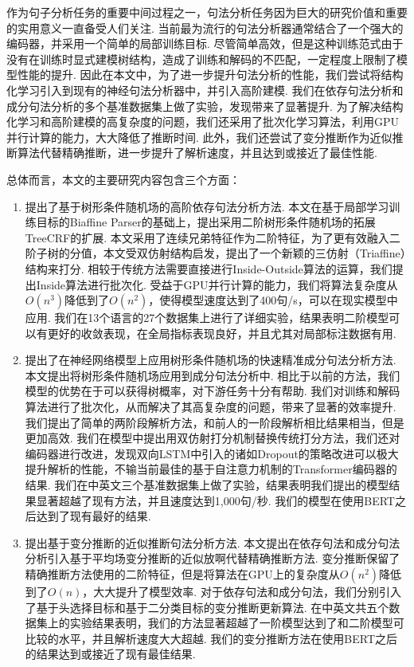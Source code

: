 
\begin{cabstract}
  作为句子分析任务的重要中间过程之一，句法分析任务因为巨大的研究价值和重要的实用意义一直备受人们关注.
  当前最为流行的句法分析器通常结合了一个强大的编码器，并采用一个简单的局部训练目标.
  尽管简单高效，但是这种训练范式由于没有在训练时显式建模树结构，造成了训练和解码的不匹配，一定程度上限制了模型性能的提升.
  因此在本文中，为了进一步提升句法分析的性能，我们尝试将结构化学习引入到现有的神经句法分析器中，并引入高阶建模.
  我们在依存句法分析和成分句法分析的多个基准数据集上做了实验，发现带来了显著提升.
  为了解决结构化学习和高阶建模的高复杂度的问题，我们还采用了批次化学习算法，利用GPU并行计算的能力，大大降低了推断时间.
  此外，我们还尝试了变分推断作为近似推断算法代替精确推断，进一步提升了解析速度，并且达到或接近了最佳性能.

  总体而言，本文的主要研究内容包含三个方面：
  \begin{enumerate}
    \item 提出了基于树形条件随机场的高阶依存句法分析方法.
          本文在基于局部学习训练目标的Biaffine Parser的基础上，提出采用二阶树形条件随机场的拓展TreeCRF的扩展.
          本文采用了连续兄弟特征作为二阶特征，为了更有效融入二阶子树的分值，本文受双仿射结构启发，提出了一个新颖的三仿射（Triaffine）结构来打分.
          相较于传统方法需要直接进行Inside-Outside算法的运算，我们提出Inside算法进行批次化.
          受益于GPU并行计算的能力，我们将算法复杂度从$O(n^3)$降低到了$O(n^2)$，使得模型速度达到了400句/s，可以在现实模型中应用.
          我们在13个语言的27个数据集上进行了详细实验，结果表明二阶模型可以有更好的收敛表现，在全局指标表现良好，并且尤其对局部标注数据有用.
    \item 提出了在神经网络模型上应用树形条件随机场的快速精准成分句法分析方法.
          本文提出将树形条件随机场应用到成分句法分析中.
          相比于以前的方法，我们模型的优势在于可以获得树概率，对下游任务十分有帮助.
          我们对训练和解码算法进行了批次化，从而解决了其高复杂度的问题，带来了显著的效率提升.
          我们提出了简单的两阶段解析方法，和前人的一阶段解析相比结果相当，但是更加高效.
          我们在模型中提出用双仿射打分机制替换传统打分方法，我们还对编码器进行改进，发现双向LSTM中引入的诸如Dropout的策略改进可以极大提升解析的性能，不输当前最佳的基于自注意力机制的Transformer编码器的结果.
          我们在中英文三个基准数据集上做了实验，结果表明我们提出的模型结果显著超越了现有方法，并且速度达到1,000句/秒.
          我们的模型在使用BERT之后达到了现有最好的结果.
    \item 提出基于变分推断的近似推断句法分析方法.
          本文提出在依存句法和成分句法分析引入基于平均场变分推断的近似放啊代替精确推断方法.
          变分推断保留了精确推断方法使用的二阶特征，但是将算法在GPU上的复杂度从$O(n^2)$降低到了$O(n)$，大大提升了模型效率.
          对于依存句法和成分句法，我们分别引入了基于头选择目标和基于二分类目标的变分推断更新算法.
          在中英文共五个数据集上的实验结果表明，我们的方法显著超越了一阶模型达到了和二阶模型可比较的水平，并且解析速度大大超越.
          我们的变分推断方法在使用BERT之后的结果达到或接近了现有最佳结果.
  \end{enumerate}




\end{cabstract}

